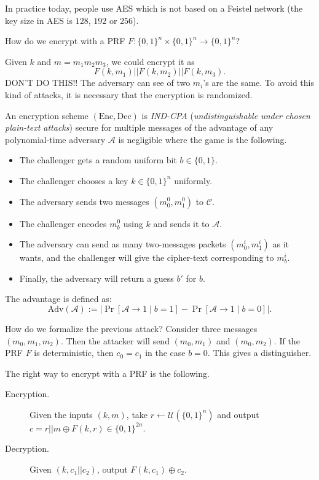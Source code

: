 \documentclass[./main]{subfiles}
\begin{document}
  In practice today, people use AES which is not based on a Feistel network (the key size in AES is $128$, $192$ or $256$).

  How do we encrypt with a PRF $F : \{0,1\}^n \times \{0,1\}^n \to \{0,1\}^n$?

  Given $k$ and $m = m_1 m_2 m_3$, we could encrypt it as 
  \[
  F(k, m_1) || F(k, m_2) || F(k, m_3)
  .\]
  DON'T DO THIS!!
  The adversary can see of two $m_i$'s are the same.
  To avoid this kind of attacks, it is necessary that the encryption is randomized.


  An encryption scheme $(\mathrm{Enc}, \mathrm{Dec})$ is \textit{IND-CPA} (\textit{undistinguishable under chosen plain-text attacks}) secure for multiple messages of the advantage of any polynomial-time adversary $\mathcal{A}$ is negligible where the game is the following.
  \begin{itemize}
    \item The challenger gets a random uniform bit $b \in \{0,1\}$.
    \item The challenger chooses a key $k \in \{0,1\}^n$ uniformly.
    \item The adversary sends two messages $(m^{0}_0, m^{0}_1)$ to $\mathcal{C}$.
    \item The challenger encodes $m^0_b$ using $k$ and sends it to $\mathcal{A}$.
    \item The adversary can send as many two-messages packets $(m_0^i, m_1^i)$ as it wants, and the challenger will give the cipher-text corresponding to $m^{i}_b$.
    \item Finally, the adversary will return a guess $b'$ for $b$.
  \end{itemize}

  The advantage is defined as:
  \[
    \mathrm{Adv}(\mathcal{A}) := \big| \Pr[\mathcal{A} \to 1  \mid b = 1] - \Pr[\mathcal{A} \to 1  \mid b = 0] \big|
  .\]


  How do we formalize the previous attack?
  Consider three messages $(m_0, m_1, m_2)$.
  Then the attacker will send $(m_0, m_1)$ and $(m_0, m_2)$.
  If the PRF $F$ is deterministic, then $c_0 = c_1$ in the case  $b = 0$.
  This gives a distinguisher.


  The right way to encrypt with a PRF is the following.
  \begin{description}
    \item[Encryption.]
      Given the inputs $(k,m)$, take  $r \gets \mathcal{U}(\{0,1\}^n)$ and output $c = r || m \oplus F(k, r) \in \{0,1\}^{2n}$.
    \item[Decryption.]
      Given $(k, c_1 || c_2)$, output $F(k, c_1) \oplus c_2$.
  \end{description}
\end{document}
